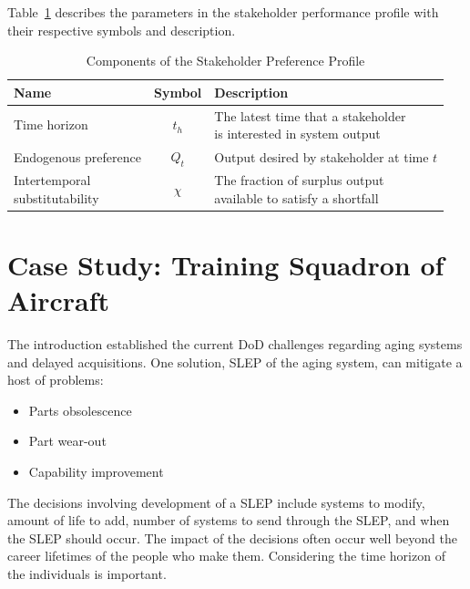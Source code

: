 \documentclass[preprint,12pt]{elsarticle}
\begin{document}
Table~\ref{t:StakeParameters} describes the parameters in the
stakeholder performance profile with their respective symbols and
description.

\begin{table}[h]
  \begin{center}
  \caption{Components of the Stakeholder Preference Profile}
  \label{t:StakeParameters}
  \begin{tabular}{l c l}
    \hline
    \hline
    \textbf{Name} & \textbf{Symbol} & \textbf{Description} \\
    \hline
    Time horizon &
    $t_h$ &
    \makecell[l]{The latest time that a stakeholder \\
              is interested in system output} \\
    Endogenous preference &
    $Q_t$ &
    \makecell[l]{Output desired by stakeholder\\
              at time $t$} \\
    \makecell[l]{Intertemporal\\substitutability} &
    $\chi$ &
    \makecell[l]{The fraction of surplus output \\
              available to satisfy a shortfall}\\
    \hline
  \end{tabular}
  \end{center}
\end{table}

\section{Case Study: Training Squadron of Aircraft}
\label{s:CaseStudy}
The introduction established the current DoD challenges regarding
aging systems and delayed acquisitions\cite{Burgess2015,LaGrone2016,awstf35}. One solution, SLEP of the
aging system, can mitigate a host of problems: 
\begin{itemize}
\item Parts obsolescence \cite{Tomczykowski2001}
\item Part wear-out \cite{jennings2018}
\item Capability improvement \cite{Burgess2015}
\end{itemize}

The decisions involving development of a SLEP include systems to modify, amount of life to add, number of
systems to send through the SLEP, and when the SLEP should occur. The impact of the
decisions often occur well beyond the career lifetimes of the people
who make them. Considering the time horizon of the individuals is important.
\end{document}
